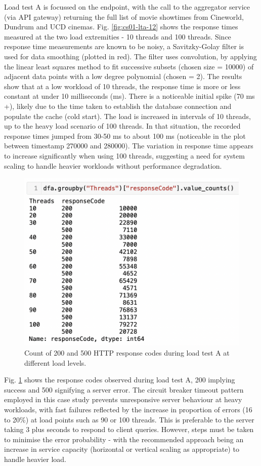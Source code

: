 Load test A is focussed on the  endpoint, with the call to the aggregator service (via API gateway) returning the full list of movie showtimes from Cineworld, Dundrum and UCD cinemas. Fig. \ref{fig:cs01-lta-12} shows the response times measured at the two load extremities - 10 threads and 100 threads. Since response time measurements are known to be noisy, a Savitzky-Golay filter is used for data smoothing (plotted in red). The filter uses convolution, by applying the linear least squares method to fit successive subsets (chosen size = 10000) of adjacent data points with a low degree polynomial (chosen = 2). The results show that at a low workload of 10 threads, the response time is more or less constant at under 10 milliseconds (ms). There is a noticeable initial spike (70 ms +), likely due to the time taken to establish the database connection and populate the cache (cold start). The load is increased in intervals of 10 threads, up to the heavy load scenario of 100 threads. In that situation, the recorded response times jumped from 30-50 ms to about 100 ms (noticeable in the plot between timestamp 270000 and 280000). The variation in response time appears to increase significantly when using 100 threads, suggesting a need for system scaling to handle heavier workloads without performance degradation.

\begin{figure}[H]
  \centering
  \includegraphics[width=0.6\linewidth]{./assets/images/case-studies/cs01-lta-3.png}
  \caption{Count of 200 and 500 HTTP response codes during load test A at different load levels.}
  \label{fig:cs01-lta-3}
\end{figure}

Fig. \ref{fig:cs01-lta-3} shows the response codes observed during load test A, 200 implying success and 500 signifying a server error. The circuit breaker timeout pattern employed in this case study prevents unresponsive server behaviour at heavy workloads, with fast failures reflected by the increase in proportion of errors (16 to 20\%) at load points such as 90 or 100 threads. This is preferable to the server taking 3 plus seconds to respond to client queries. However, steps must be taken to minimise the error probability - with the recommended approach being an increase in service capacity (horizontal or vertical scaling as appropriate) to handle heavier load.

